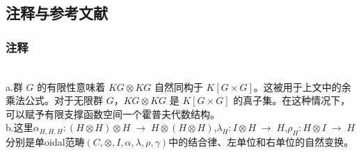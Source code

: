 \subsection{注释与参考文献}
\subsubsection{注释}\\
a.群 $G$ 的有限性意味着 $KG \otimes KG$ 自然同构于 $K[G \times G]$。这被用于上文中的余乘法公式。对于无限群 $G$，$KG \otimes KG$ 是 $K[G \times G]$ 的真子集。在这种情况下，可以赋予有限支撑函数空间一个霍普夫代数结构。\\
b.这里$\alpha_{H,H,H} : (H \otimes H) \otimes H \;\to\; H \otimes (H \otimes H)$,$\lambda_H : I \otimes H \;\to\; H$,$
\rho_H : H \otimes I \;\to\; H$分别是单oidal范畴$(C, \otimes, I, \alpha, \lambda, \rho, \gamma)$中的结合律、左单位和右单位的自然变换。
